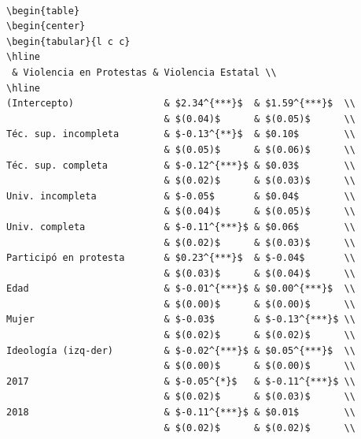 \documentclass[
  12pt,
]{article}
\begin{document}
\begin{verbatim}

\begin{table}
\begin{center}
\begin{tabular}{l c c}
\hline
 & Violencia en Protestas & Violencia Estatal \\
\hline
(Intercepto)                & $2.34^{***}$  & $1.59^{***}$  \\
                            & $(0.04)$      & $(0.05)$      \\
Téc. sup. incompleta        & $-0.13^{**}$  & $0.10$        \\
                            & $(0.05)$      & $(0.06)$      \\
Téc. sup. completa          & $-0.12^{***}$ & $0.03$        \\
                            & $(0.02)$      & $(0.03)$      \\
Univ. incompleta            & $-0.05$       & $0.04$        \\
                            & $(0.04)$      & $(0.05)$      \\
Univ. completa              & $-0.11^{***}$ & $0.06$        \\
                            & $(0.02)$      & $(0.03)$      \\
Participó en protesta       & $0.23^{***}$  & $-0.04$       \\
                            & $(0.03)$      & $(0.04)$      \\
Edad                        & $-0.01^{***}$ & $0.00^{***}$  \\
                            & $(0.00)$      & $(0.00)$      \\
Mujer                       & $-0.03$       & $-0.13^{***}$ \\
                            & $(0.02)$      & $(0.02)$      \\
Ideología (izq-der)         & $-0.02^{***}$ & $0.05^{***}$  \\
                            & $(0.00)$      & $(0.00)$      \\
2017                        & $-0.05^{*}$   & $-0.11^{***}$ \\
                            & $(0.02)$      & $(0.03)$      \\
2018                        & $-0.11^{***}$ & $0.01$        \\
                            & $(0.02)$      & $(0.02)$      \\

\end{verbatim}
\end{document}
